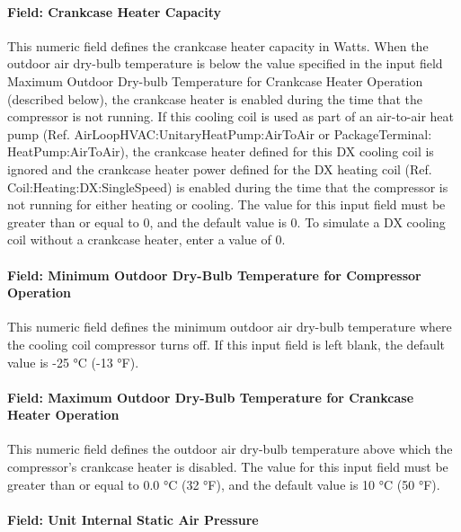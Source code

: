 \paragraph{Field: Crankcase Heater Capacity}

This numeric field defines the crankcase heater capacity in Watts. When the outdoor air dry-bulb temperature is below the value specified in the input field Maximum Outdoor Dry-bulb Temperature for Crankcase Heater Operation (described below), the crankcase heater is enabled during the time that the compressor is not running. If this cooling coil is used as part of an air-to-air heat pump (Ref. AirLoopHVAC:UnitaryHeatPump:AirToAir or PackageTerminal: HeatPump:AirToAir), the crankcase heater defined for this DX cooling coil is ignored and the crankcase heater power defined for the DX heating coil (Ref. Coil:Heating:DX:SingleSpeed) is enabled during the time that the compressor is not running for either heating or cooling. The value for this input field must be greater than or equal to 0, and the default value is 0. To simulate a DX cooling coil without a crankcase heater, enter a value of 0.

\paragraph{Field: Minimum Outdoor Dry-Bulb Temperature for Compressor Operation}

This numeric field defines the minimum outdoor air dry-bulb temperature where the cooling coil compressor turns off. If this input field is left blank, the default value is -25 °C (-13 °F).

\paragraph{Field: Maximum Outdoor Dry-Bulb Temperature for Crankcase Heater Operation}

This numeric field defines the outdoor air dry-bulb temperature above which the compressor's crankcase heater is disabled. The value for this input field must be greater than or equal to 0.0 °C (32 °F), and the default value is 10 °C (50 °F).

\paragraph{Field: Unit Internal Static Air Pressure}


